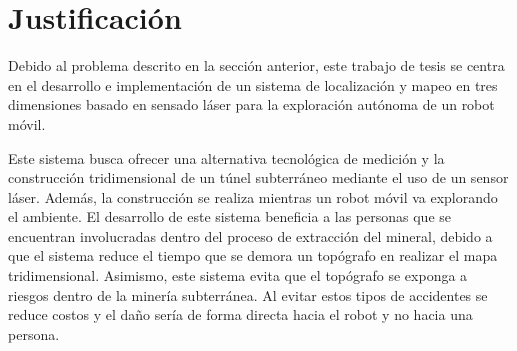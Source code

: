 \section{Justificación}

Debido al problema descrito en la sección anterior, este trabajo de tesis se centra 
en el desarrollo e implementación de un sistema de localización y mapeo en tres 
dimensiones basado en sensado láser para la exploración autónoma de un robot móvil.

Este sistema busca ofrecer una alternativa tecnológica de medición y la construcción 
tridimensional de un túnel subterráneo mediante el uso de un sensor láser. Además, la
construcción se realiza mientras un robot móvil va explorando el ambiente. El 
desarrollo de este sistema beneficia a las personas que se encuentran involucradas 
dentro del proceso de extracción del mineral, debido a que el sistema reduce el tiempo 
que se demora un topógrafo en realizar el mapa tridimensional. Asimismo, este sistema 
evita que el topógrafo se exponga a riesgos dentro de la minería subterránea. Al evitar 
estos tipos de accidentes se reduce costos y el daño sería de forma directa hacia el 
robot y no hacia una persona.


